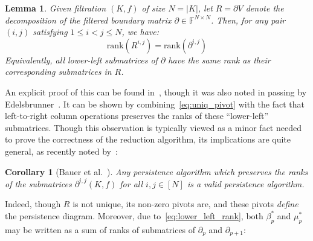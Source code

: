 \documentclass[10pt]{article}
\numberwithin{equation}{section}
\newcommand{\+}{%
	\raisebox{0.18ex}{\scaleobj{0.55}{+}}
}
\newtheorem{corollary}{Corollary}
\newtheorem{lemma}{Lemma}
\theoremstyle{definition}
\theoremstyle{definition}
\begin{document}
\begin{lemma}\label{lemma:rank}
Given filtration $(K, f)$ of size $N = \lvert K \rvert$, let $R = \partial V$ denote the decomposition of the filtered boundary matrix $\partial \in \mathbb{F}^{N \times N}$. Then, for any pair $(i,j)$ satisfying $1 \leq i < j \leq N$, we have:
	\begin{equation}\label{eq:lower_left_rank}
		\mathrm{rank}(R^{i,j}) = \mathrm{rank}(\partial^{i, j})
	\end{equation}
Equivalently, all lower-left submatrices of $\partial$ have the same rank as their corresponding submatrices in $R$.
\end{lemma} %
\noindent
An explicit proof of this can be found in~\cite{dey2022computational}, though it was also noted in passing by Edelsbrunner~\cite{edelsbrunner2000topological}. It can be shown by combining~\eqref{eq:uniq_pivot} with the fact that left-to-right column operations preserves the ranks of these ``lower-left'' submatrices.
Though this observation is typically viewed as a minor fact needed to prove the correctness of the reduction algorithm, its implications are quite general, as recently noted by~\cite{bauer2022keeping}:
\begin{corollary}[Bauer et al.~\cite{bauer2022keeping}]
	Any persistence algorithm which preserves the ranks of the submatrices $\partial^{i,j}(K, f)$ for all $i,j \in [N]$ is a valid persistence algorithm. 
\end{corollary}
\noindent Indeed, though $R$ is not unique, its non-zero pivots are, and these pivots \emph{define} the persistence diagram. Moreover, due to~\eqref{eq:lower_left_rank}, both $\beta_p^{\ast}$ and $\mu_p^{\ast}$ may be written as a sum of ranks of submatrices of $\partial_p$ and $\partial_{p+1}$:
\end{document}
